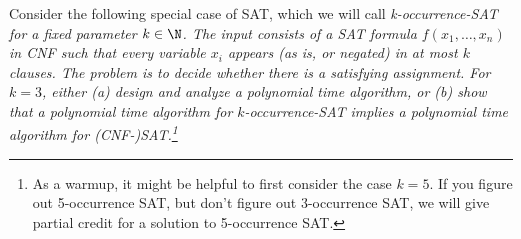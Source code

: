\documentclass{article}
\begin{document}
\setcounter{section}{9}
\setcounter{exercise}{8}
\begin{exercise}
  Consider the following special case of SAT, which we will call \it{k-occurrence-SAT} for a fixed parameter \( k \in \N \).
  The input consists of a SAT formula \( f (x_1, \ldots, x_n) \) in CNF such that every variable \( x_i \) appears (as is, or negated) in at most \( k \) clauses.
  The problem is to decide whether there is a satisfying assignment.
  For \( k = 3 \), either (a) design and analyze a polynomial time algorithm, or (b) show that a polynomial time algorithm for \( k \)-occurrence-SAT implies a polynomial time algorithm for (CNF-)SAT.\footnote{As a warmup, it might be helpful to first consider the case \( k = 5 \).
  If you figure out 5-occurrence SAT, but don't figure out 3-occurrence SAT, we will give partial credit for a solution to 5-occurrence SAT.}
\end{exercise}
\end{document}
